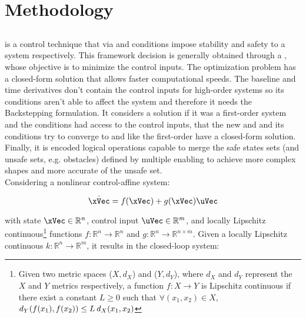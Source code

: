 
%


\chapter{Methodology}
\label{cha:methodology}

\glsresetall %




\section{}
\label{sec:clf_cbf}  

 is a control technique that via  and  conditions impose stability and safety to a system respectively. This framework decision is generally obtained through a , whose objective is to minimize the control inputs. The optimization problem has a closed-form solution that allows faster computational speeds. The baseline  and  time derivatives don't contain the control inputs for high-order systems so its conditions aren't able to affect the system and therefore it needs the Backstepping formulation. It considers a solution if it was a first-order system and the conditions had access to the control inputs, that the new  and  and its conditions try to converge to and like the first-order  have a closed-form solution. Finally, it is encoded logical operations capable to merge the safe states sets (and unsafe sets, e.g. obstacles) defined by multiple  enabling to achieve more complex shapes and more accurate of the unsafe set.\\  

Considering a nonlinear control-affine system:

\begin{equation}
    \dot{\xVec} = f(\xVec) + g(\xVec)\uVec
    \label{eq:Nonlinear-First-Order-System} 
\end{equation}

with state \(\xVec \in \mathbb{R}^n\), control input \(\uVec \in \mathbb{R}^m\), and locally Lipschitz continuous\footnote{Given two metric spaces (\(X, d_X\)) and (\(Y, d_Y\)), where \(d_X\) and \(d_Y\)  represent the \(X\) and \(Y\) metrics respectively, a function \(f:X \to Y\) is Lipschitz continuous if there exist a constant \(L \geq 0\) such that \(\forall (x_1,x_2) \in X\), \hspace{0.4em} \(d_Y(f(x_1),f(x_2))\leq L \hspace{0.2em} d_X(x_1,x_2)\)} functions \(f: \mathbb{R}^n \to \mathbb{R}^n\) and \(g: \mathbb{R}^n \to \mathbb{R}^{n \times m}\). Given a locally Lipschitz continuous \(k: \mathbb{R}^n \to \mathbb{R}^m\), it results in the closed-loop system:

